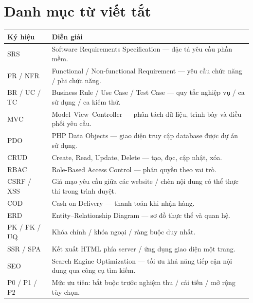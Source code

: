 \section*{Danh mục từ viết tắt}
\begin{longtable}{@{}P{2.4cm}P{12.7cm}@{}}
\toprule Ký hiệu & Diễn giải \\ \midrule\endhead
SRS & Software Requirements Specification — đặc tả yêu cầu phần mềm.\\
FR / NFR & Functional / Non-functional Requirement — yêu cầu chức năng / phi chức năng.\\
BR / UC / TC & Business Rule / Use Case / Test Case — quy tắc nghiệp vụ / ca sử dụng / ca kiểm thử.\\
MVC & Model–View–Controller — phân tách dữ liệu, trình bày và điều phối yêu cầu.\\
PDO & PHP Data Objects — giao diện truy cập database được dự án sử dụng.\\
CRUD & Create, Read, Update, Delete — tạo, đọc, cập nhật, xóa.\\
RBAC & Role-Based Access Control — phân quyền theo vai trò.\\
CSRF / XSS & Giả mạo yêu cầu giữa các website / chèn nội dung có thể thực thi trong trình duyệt.\\
COD & Cash on Delivery — thanh toán khi nhận hàng.\\
ERD & Entity–Relationship Diagram — sơ đồ thực thể và quan hệ.\\
PK / FK / UQ & Khóa chính / khóa ngoại / ràng buộc duy nhất.\\
SSR / SPA & Kết xuất HTML phía server / ứng dụng giao diện một trang.\\
SEO & Search Engine Optimization — tối ưu khả năng tiếp cận nội dung qua công cụ tìm kiếm.\\
P0 / P1 / P2 & Mức ưu tiên: bắt buộc trước nghiệm thu / cải tiến / mở rộng tùy chọn.\\
\bottomrule
\end{longtable}
\clearpage
